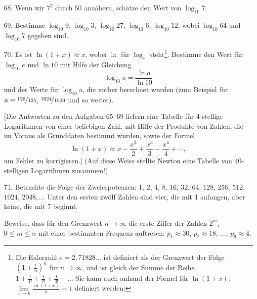 \begin{problem}{68.}
	Wenn wir $7^2$ durch $50$ annähern, schätze den Wert von $\log_{10} 7$.
\end{problem}

\begin{problem}{69.}
	Bestimme $\log_{10} 9$, $\log_{10} 3$, $\log_{10} 27$, $\log_{10} 6$, $\log_{10} 12$, wobei $\log_{10} 64$ und $\log_{10} 7$ gegeben sind.
\end{problem}

\begin{problem}{70.}
	Es ist $\ln (1+x) \approx x$, wobei $\ln$ für $\log_e$ steht\footnote{Die Eulerzahl $e = 2{,}71828\dots$ ist definiert als der Grenzwert der Folge $\left(1+\frac1n\right)^n$ für $n\to \infty$, und ist gleich der Summe der Reihe 
	$1+\frac 1{1!} +\frac 1{2!}+\frac 1{3!}+\dots{}$ Sie kann auch anhand der Formel für $\ln (1+x)$: $\lim\limits_{x\to 0}\frac{\ln(1+x)}{x} = 1$ definiert werden.}. Bestimme den Wert für $\log_{10} e$ und $\ln 10$ mit Hilfe der Gleichung 
	\begin{equation*}
		\log_{10} a=\frac{\ln a}{\ln 10}
	\end{equation*} 
	und der Werte für $\log_{10} a$, die vorher berechnet wurden (zum Beispiel für $a=\nicefrac{128}{125}$, $\nicefrac{1024}{1000}$ und so weiter).
	
	[Die Antworten zu den Aufgaben 65--69 liefern eine Tabelle für 4-stellige Logarithmen von einer beliebigen Zahl, mit Hilfe der Produkte von Zahlen, die im Voraus als Grunddaten bestimmt wurden, sowie der Formel 
	\begin{equation*}
		\ln (1+x) \approx x-\frac{x^2}{2}+\frac{x^3}{3}-\frac{x^4}{4}+\dotsb,
	\end{equation*}
	um Fehler zu korrigieren.] (Auf diese Weise stellte Newton eine Tabelle von 40-stelligen Logarithmen zusammen!)
\end{problem}

\begin{problem}{71.}
	Betrachte die Folge der Zweierpotenzen: $1$, $2$, $4$, $8$, $16$, $32$, $64$, $128$, $256$, $512$, $1024$, $2048, \dotsc$ Unter den ersten zwölf Zahlen sind vier, die mit 1 anfangen, aber keine, die mit 7 beginnt. 

	Beweise, dass für den Grenzwert $n \to \infty$ die erste Ziffer der Zahlen $2^m$,
	$0\leqslant m \leqslant n$ mit einer bestimmten Frequenz auftreten: 
	$p_1 \approx 30$, $p_2 \approx 18$, $\dots$, $p_9 \approx 4$.
\end{problem}

